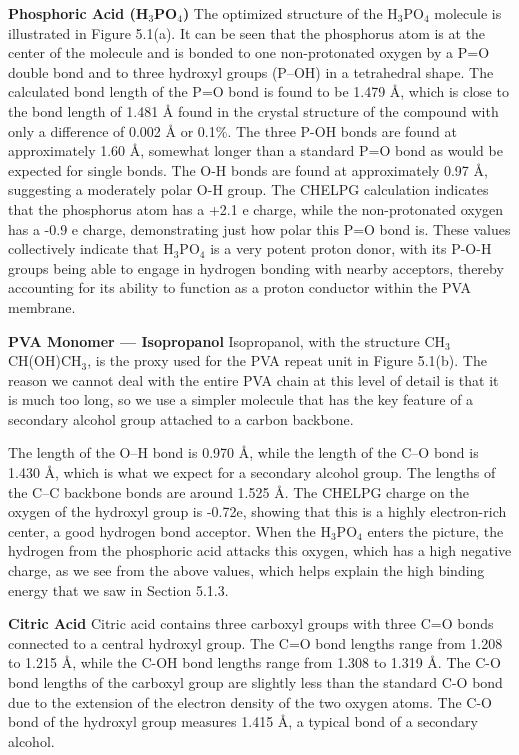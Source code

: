 \documentclass[12pt,a4paper]{report}
\begin{document}
\textbf{Phosphoric Acid (H\(_3\)PO\(_4\))}
The optimized structure of the H\(_3\)PO\(_4\) molecule is illustrated in Figure 5.1(a). It can be seen that the phosphorus atom is at the center of the molecule and is bonded to one non-protonated oxygen by a P=O double bond and to three hydroxyl groups (P–OH) in a tetrahedral shape. The calculated bond length of the P=O bond is found to be 1.479 Å, which is close to the bond length of 1.481 Å found in the crystal structure of the compound with only a difference of 0.002 Å or 0.1\%.\cite{76}
The three P-OH bonds are found at approximately 1.60 Å, somewhat longer than a standard P=O bond as would be expected for single bonds. The O-H bonds are found at approximately 0.97 Å, suggesting a moderately polar O-H group. The CHELPG calculation\cite{99} indicates that the phosphorus atom has a +2.1 e charge, while the non-protonated oxygen has a -0.9 e charge, demonstrating just how polar this P=O bond is. These values collectively indicate that H\(_3\)PO\(_4\) is a very potent proton donor, with its P-O-H groups being able to engage in hydrogen bonding with nearby acceptors, thereby accounting for its ability to function as a proton conductor within the PVA membrane.

\textbf{PVA Monomer — Isopropanol}
Isopropanol, with the structure CH\(_3\)CH(OH)CH\(_3\), is the proxy used for the PVA repeat unit in Figure 5.1(b). The reason we cannot deal with the entire PVA chain at this level of detail is that it is much too long, so we use a simpler molecule that has the key feature of a secondary alcohol group attached to a carbon backbone.\cite{18,19}

The length of the O–H bond is 0.970 Å, while the length of the C–O bond is 1.430 Å, which is what we expect for a secondary alcohol group. The lengths of the C–C backbone bonds are around 1.525 Å. The CHELPG charge on the oxygen of the hydroxyl group is -0.72e,\cite{99} showing that this is a highly electron-rich center, a good hydrogen bond acceptor. When the H\(_3\)PO\(_4\) enters the picture, the hydrogen from the phosphoric acid attacks this oxygen, which has a high negative charge, as we see from the above values, which helps explain the high binding energy that we saw in Section 5.1.3.

\textbf{Citric Acid}
Citric acid contains three carboxyl groups with three C=O bonds connected to a central hydroxyl group. The C=O bond lengths range from 1.208 to 1.215 Å, while the C-OH bond lengths range from 1.308 to 1.319 Å. The C-O bond lengths of the carboxyl group are slightly less than the standard C-O bond due to the extension of the electron density of the two oxygen atoms. The C-O bond of the hydroxyl group measures 1.415 Å, a typical bond of a secondary alcohol.
\end{document}

